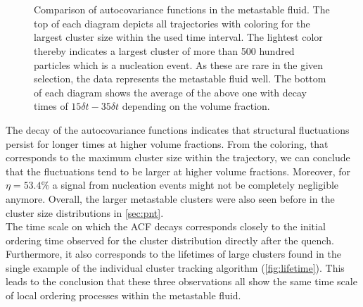 \begin{figure}[h]
\begin{center}
 \hspace{0.5cm}
 \\
 \hspace{0.5cm}
 \\
\caption[Autocovariance functions of largest cluster in the metastable fluid]{Comparison of autocovariance functions in the metastable fluid. The top of each diagram depicts all trajectories with coloring for the largest cluster size within the used time interval. The lightest color thereby indicates a largest cluster of more than 500 hundred particles which is a nucleation event. As these are rare in the given selection, the data represents the metastable fluid well. The bottom of each diagram shows the average of the above one with decay times of $ 15 \delta t- 35 \delta t$ depending on the volume fraction. }
\label{fig:acf}
\end{center}
\end{figure}

The decay of the autocovariance functions indicates that structural fluctuations persist for longer times at higher volume fractions. From the coloring, that corresponds to the maximum cluster size within the trajectory, we can conclude that the fluctuations tend to be larger at higher volume fractions. Moreover, for $\eta=53.4\%$ a signal from nucleation events might not be completely negligible anymore. Overall, the larger metastable clusters were also seen before in the cluster size distributions in \autoref{sec:pnt}.\\
The time scale on which the ACF decays corresponds closely to the initial ordering time observed for the cluster distribution directly after the quench. Furthermore, it also corresponds to the lifetimes of large clusters found in the single example of the individual cluster tracking algorithm (\autoref{fig:lifetime}). This leads to the conclusion that these three observations all show the same time scale of local ordering processes within the metastable fluid. 

